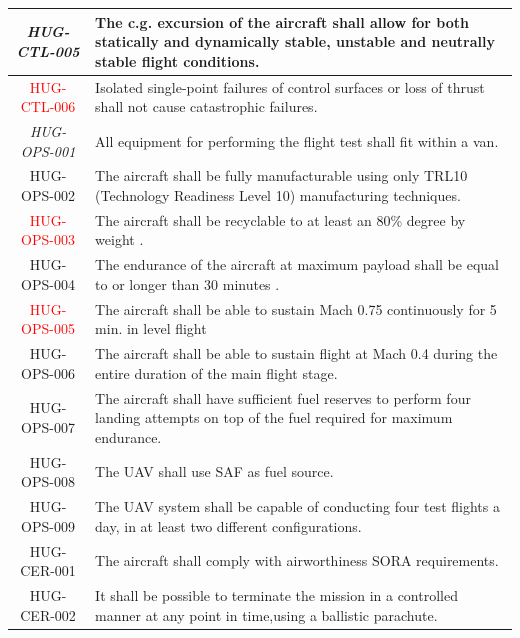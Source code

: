 \begin{longtable}{|c|p{13cm}|}
\textit{HUG-CTL-005} & The c.g. excursion of the aircraft shall allow for both statically and dynamically stable, unstable and neutrally stable flight conditions. \\ \hline

\textcolor{red}{HUG-CTL-006}&  Isolated single-point failures of control surfaces or loss of thrust shall not cause catastrophic failures. \\ \hline

\textit{HUG-OPS-001} & All equipment for performing the flight test shall fit within a van. 
\\ \hline
HUG-OPS-002 & The aircraft shall be fully manufacturable using only TRL10 (Technology Readiness Level 10) manufacturing techniques.\\ \hline

\textcolor{red}{HUG-OPS-003} & The aircraft shall be recyclable to at least an 80\% degree by weight \cite{peregrine2021}. \\ \hline

HUG-OPS-004 & The endurance of the aircraft at maximum payload shall be equal to or longer than 30 minutes \cite{Castro2026}. \\ \hline

\textcolor{red}{HUG-OPS-005} & The aircraft shall be able to sustain Mach 0.75 continuously for 5 min. in level flight \\ \hline

HUG-OPS-006 & The aircraft shall be able to sustain flight at Mach 0.4 during the entire duration of the main flight stage. \\ \hline

HUG-OPS-007 & The aircraft shall have sufficient fuel reserves to perform four landing attempts on top of the fuel required for maximum endurance.  \\ \hline

HUG-OPS-008 & The UAV shall use SAF as fuel source.\\
\hline

HUG-OPS-009 & The UAV system shall be capable of conducting four test flights a day, in at least two different configurations.\\
\hline

HUG-CER-001 & The aircraft shall comply with airworthiness SORA requirements.\\ \hline

HUG-CER-002 & It shall be possible to terminate the mission in a controlled manner at any point in time,using a ballistic parachute. \\ \hline


\end{longtable}
